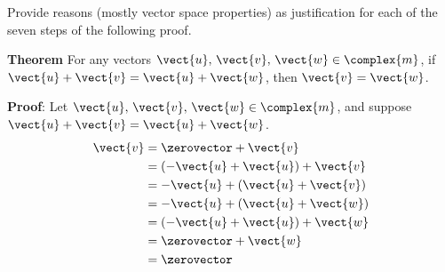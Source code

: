 Provide reasons (mostly vector space properties) as justification for each of the seven steps of the following proof.\par
%
{\bf Theorem}
For any vectors $\vect{u},\,\vect{v},\,\vect{w}\in\complex{m}$,
if $\vect{u} + \vect{v} = \vect{u} + \vect{w}$, then $\vect{v} = \vect{w}$.\par
%
{\bf Proof}: Let $\vect{u},\,\vect{v},\,\vect{w}\in\complex{m}$,
and suppose $\vect{u} + \vect{v} = \vect{u} + \vect{w}$.
%
\begin{align*}
\vect{v}
&= \zerovector + \vect{v}\\
&= (-\vect{u} + \vect{u}) + \vect{v}\\
&= -\vect{u} + (\vect{u} + \vect{v})\\
&= -\vect{u} + (\vect{u} + \vect{w})\\
&= (-\vect{u} + \vect{u}) + \vect{w}\\
&= \zerovector + \vect{w}\\
&= \zerovector
\end{align*}

